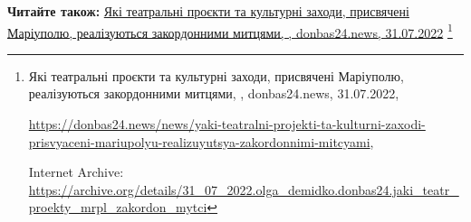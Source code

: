  
 
 
 
 

\def\pubIA{https://archive.org/details/31_07_2022.olga_demidko.donbas24.jaki_teatr_proekty_mrpl_zakordon_mytci}
\def\pubTitle{Які театральні проєкти та культурні заходи, присвячені Маріуполю, реалізуються закордонними митцями}
\def\pubDate{31.07.2022}
\def\pubOrigin{https://donbas24.news/news/yaki-teatralni-projekti-ta-kulturni-zaxodi-prisvyaceni-mariupolyu-realizuyutsya-zakordonnimi-mitcyami}
\def\pubAuthor{\pubAuthorDemidko}
\def\pubSite{donbas24.news}

\textbf{Читайте також:} \href{\pubIA}{%
\pubTitle, \pubAuthor, \pubSite, \pubDate}%
\footnote{\pubTitle, \pubAuthor, \pubSite, \pubDate, \par\url{\pubOrigin}, \par Internet Archive: \url{\pubIA}}
